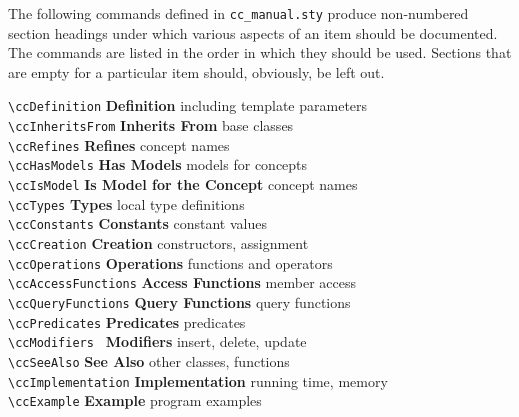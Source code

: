 The following commands defined in {\tt cc\_manual.sty} produce non-numbered
section headings under which various aspects of an item should be documented.  
The commands are listed in the order in which they should be used.  Sections
that are empty for a particular item should, obviously, be left out. 

\begin{tabbing}
  \> \verb+\ccDefinition+      \>  {\bf Definition}    \>
                                          including template parameters\\
  \> \verb+\ccInheritsFrom+    \>  {\bf Inherits From}     \>
                                                     base classes\\
  \> \verb+\ccRefines+         \>  {\bf Refines}     \>
                                                     concept names\\
  \> \verb+\ccHasModels+       \>  {\bf Has Models}     \>
                                                     models for concepts\\
  \> \verb+\ccIsModel+         \>  {\bf Is Model for the Concept}     \>
                                                     concept names\\
  \> \verb+\ccTypes+           \>  {\bf Types}         \>
                                                     local type definitions\\ 
  \> \verb+\ccConstants+       \>  {\bf Constants}     \>
                                                     constant values\\
  \> \verb+\ccCreation+        \>  {\bf Creation}      \>
                                                     constructors, assignment\\ 
  \> \verb+\ccOperations+      \>  {\bf Operations}    \>
                                                     functions and operators\\ 
  \> \verb+\ccAccessFunctions+ \>  {\bf Access Functions}    \>
                                                     member access\\ 
  \> \verb+\ccQueryFunctions+ \>   {\bf Query Functions}    \>
                                                     query functions\\
  \> \verb+\ccPredicates+      \>  {\bf Predicates}    \>
                                                     predicates\\
  \> \verb+\ccModifiers +      \>  {\bf Modifiers}    \>
                                                     insert, delete, update\\
  \> \verb+\ccSeeAlso+         \>  {\bf See Also}\>
                                                     other classes, functions\\
  \> \verb+\ccImplementation+  \>  {\bf Implementation}\>
                                                     running time, memory\\
  \> \verb+\ccExample+         \>  {\bf Example}       \>
                                                     program examples
\end{tabbing}


